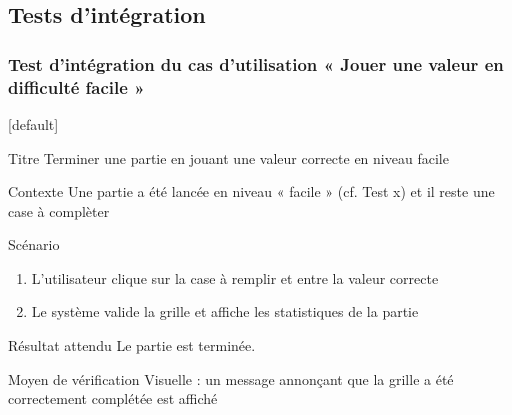 \documentclass{beamer}
\begin{document}
\subsection{Tests d’intégration}
\begin{frame}
  \frametitle{Test d’intégration  du cas d'utilisation « Jouer une valeur en difficulté facile »}
  [default]
  \begin{block}{\footnotesize{Titre}}
    \scriptsize{Terminer une partie en jouant une valeur correcte en niveau facile}
  \end{block}
  \pause
  \begin{block}{\footnotesize{Contexte}}
    \scriptsize{Une partie a été lancée en niveau « facile » (cf. Test \no x) et il reste une case à complèter}
  \end{block}
  \begin{block}{\footnotesize{Scénario}}
    \begin{enumerate}
      [circle]
      \item
        \scriptsize{L’utilisateur clique sur la case à remplir et entre la valeur correcte}
      \item
        \scriptsize{Le système valide la grille et affiche les statistiques de la partie}
    \end{enumerate}
  \end{block}
  \pause
  \begin{block}{\footnotesize{Résultat attendu}}
    \scriptsize{Le partie est terminée.}
  \end{block}
  \begin{block}{\footnotesize{Moyen de vérification}}
    \scriptsize{Visuelle : un message annonçant que la grille a été correctement complétée est affiché}
  \end{block}
\end{frame}
\end{document}
